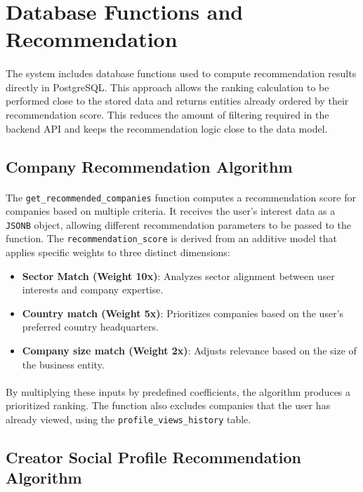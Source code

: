 \section{Database Functions and Recommendation}
\paragraph{}The system includes database functions used to compute recommendation results directly in PostgreSQL. This approach allows the ranking calculation to be performed close to the stored data and returns entities already ordered by their recommendation score. This reduces the amount of filtering required in the backend API and keeps the recommendation logic close to the data model.

\subsection{Company Recommendation Algorithm}
\paragraph{}The \texttt{get\_recommended\_companies} function computes a recommendation score for companies based on multiple criteria. It receives the user’s interest data as a \texttt{JSONB} object, allowing different recommendation parameters to be passed to the function. The \texttt{recommendation\_score} is derived from an additive model that applies specific weights to three distinct dimensions:
\begin{itemize}
\item \textbf{Sector Match (Weight 10x)}: Analyzes sector alignment between user interests and company expertise.
\item \textbf{Country match (Weight 5x)}: Prioritizes companies based on the user's preferred country headquarters.
\item \textbf{Company size match (Weight 2x)}: Adjusts relevance based on the size of the business entity.
\end{itemize}
\paragraph{}By multiplying these inputs by predefined coefficients, the algorithm produces a prioritized ranking. The function also excludes companies that the user has already viewed, using the \texttt{profile\_views\_history} table.
\subsection{Creator Social Profile Recommendation Algorithm}
